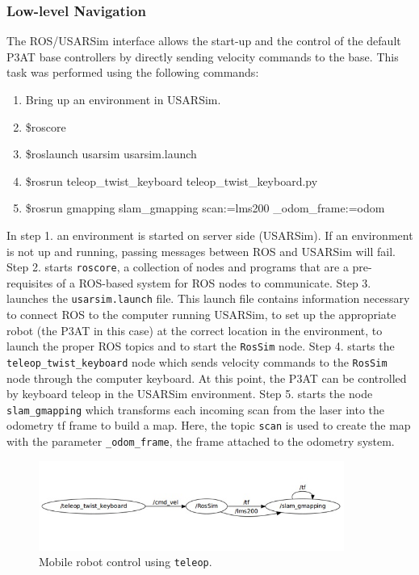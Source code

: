 \subsubsection*{Low-level Navigation}
The ROS/USARSim interface allows the start-up and the control of the default P3AT base controllers by directly sending velocity commands to the base. This task was performed using the following commands:
\begin{enumerate}
\item\footnotesize{Bring up an environment in USARSim.        }
\item\footnotesize{\$roscore}
\item\footnotesize{\$roslaunch usarsim usarsim.launch}
\item\footnotesize{\$rosrun teleop\_twist\_keyboard teleop\_twist\_keyboard.py}
\item\footnotesize{\$rosrun gmapping slam\_gmapping scan:=lms200 \_odom\_frame:=odom}
\end{enumerate}

In step 1. an environment is started on server side (USARSim). If an environment is not up and running, passing messages between ROS and USARSim will fail. Step 2. starts \texttt{roscore}, a collection of nodes and programs that are a pre-requisites of a ROS-based system for ROS nodes to communicate. Step 3. launches the \texttt{usarsim.launch} file. This launch file contains information necessary to connect ROS to the computer running USARSim, to set up the appropriate robot (the P3AT in this case) at the correct location in the environment, to launch the proper ROS topics and to start the \texttt{RosSim} node. Step 4. starts the \texttt{teleop\_twist\_keyboard} node which sends velocity commands to the \texttt{RosSim} node through the computer keyboard. At this point, the P3AT can be controlled by keyboard teleop in the USARSim environment. Step 5. starts the node \texttt{slam\_gmapping} which transforms each incoming scan from the laser into the odometry tf frame to build a map. Here, the topic \texttt{scan} is used to create the map with the parameter \texttt{\_odom\_frame}, the frame attached to the odometry system.

\begin{figure}[t!]
\centering
\includegraphics[width=10cm]{Figures/Misc/low-level.jpg}
\caption{Mobile robot control using \texttt{teleop}.}\label{fig:teleop}
\end{figure}

